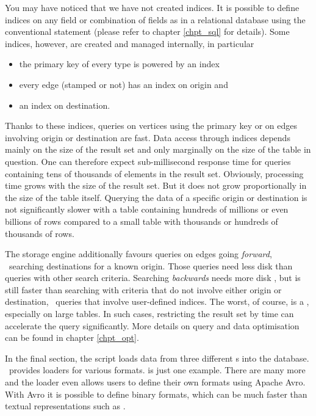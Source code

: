 You may have noticed that we have not created indices.
It is possible to define indices on any field
or combination of fields as in a relational
database using the conventional 
statement (please refer to chapter \ref{chpt_sql}
for details). Some indices, however, are created
and managed internally, in particular

\begin{itemize}
\item the primary key of every type is powered by an index
\item every edge (stamped or not) has an index on origin and
\item an index on destination.
\end{itemize}

Thanks to these indices, queries on vertices using
the primary key or on edges involving origin or destination
are fast.
Data access through indices
depends mainly on the size of the result set
and only marginally on the size of the table in question.
One can therefore expect sub-millisecond response time for
queries containing tens of thousands of elements in the result set.
Obviously, processing time grows with the size of the result set.
But it does not grow proportionally
in the size of the table itself.
Querying the data of a specific origin or destination
is not significantly slower with a table containing
hundreds of millions or even billions of rows compared to a small
table with thousands or hundreds of thousands of rows.

The storage engine additionally favours queries
on edges going \emph{forward}, \ie\
searching destinations for a known origin.
Those queries need less disk  than queries
with other search criteria.
Searching \emph{backwards} needs more disk ,
but is still faster than searching with criteria
that do not involve either origin or destination,
\eg\ queries that involve user-defined indices.
The worst, of course, is a , especially
on large tables. In such cases, restricting the
result set by time can accelerate the query
significantly.
More details on query
and data optimisation
can be found in chapter \ref{chpt_opt}.

In the final section,
the script loads data from three different s
into the database. \nowdb\ provides loaders
for various formats. \acronym{csv} is just one example.
There are many more and the loader even allows 
users to define
their own formats using Apache Avro.
With Avro it is possible to define binary formats, which
can be much faster than textual representations
such as .

